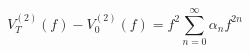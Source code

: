 \begin{equation}
V^{(2)}_T(f) - V^{(2)}_0 (f) =  
              f^2 \sum_{n=0}^\infty \alpha_n f^{2n}
\label{V2-V2generalV}
\end{equation}

